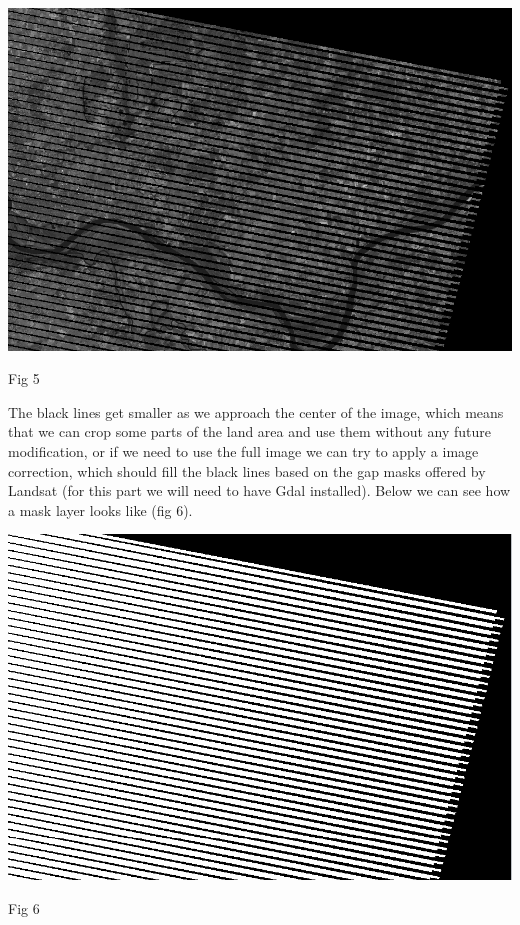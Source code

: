 \documentclass[12pt, a4paper]{report}
\begin{document}
\bigskip

\includegraphics[scale=0.54, center]{landsat_black_stripes.png} 
\begin{center}
Fig 5
\end{center}
\par 

\quad
The black lines get smaller as we approach the center of the image, which means that we can crop some parts of the land area and use them without any future modification, or if we need to use the full image we can try to apply a image correction, which should fill the black lines based on the gap masks offered by Landsat (for this part we will need to have Gdal installed). Below we can see how a mask layer looks like (fig 6).
\par 


\bigskip

\includegraphics[scale=0.54, center]{landsat_black_stripes_correction.png} 
\begin{center}
Fig 6
\end{center}
\par 
\end{document}
